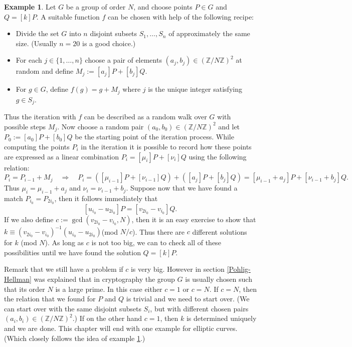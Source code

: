 \documentclass{article}
\numberwithin{equation}{section}
\theoremstyle{definition}
\newtheorem{example}[theorem]{Example}
\newcommand{\ZZ}{{\mathbb Z}} %
\newcommand{\Zmod}[1]{\ZZ / #1\ZZ} %
\begin{document}
\begin{example}\label{prhogenex}
Let $G$ be a group of order $N$, and choose points $P \in G$ and $Q=[k]P$. A suitable function $f$ can be chosen with help of the following recipe:
\begin{itemize}
\item Divide the set $G$ into $n$ disjoint subsets $S_1,\ldots,S_n$ of approximately the same size. (Usually $n=20$ is a good choice.) 
\item For each $j \in \{1,\ldots,n\}$ choose a pair of elements $(a_j,b_j)\in (\Zmod{N})^2$ at random and define $M_j:=[a_j]P+[b_j]Q$.
\item For $g\in G$, define $f(g) = g+M_j$ where $j$ is the unique integer satisfying $g \in S_j$.
\end{itemize}
Thus the iteration with $f$ can be described as a random walk over $G$ with possible steps $M_j$. Now choose a random pair $(a_0,b_0)\in (\Zmod{N})^2$ and let $P_0:=[a_0]P+[b_0]Q$ be the starting point of the iteration process. While computing the points $P_i$ in the iteration it is possible to record how these points are expressed as a linear combination $P_i=[\mu_i] P + [\nu_i] Q$ using the following relation: $$P_i=P_{i-1}+M_j \quad \Rightarrow \quad P_i = ([\mu_{i-1}]P+[\nu_{i-1}]Q)+([a_j]P+[b_j]Q) = [\mu_{i-1}+a_j]P+[\nu_{i-1}+b_j]Q.$$  Thus $\mu_i=\mu_{i-1}+a_j$ and $\nu_i=\nu_{i-1}+b_j$. Suppose now that we have found a match $P_{i_0}=P_{2i_0}$, then it follows immediately that $$[u_{i_0}-u_{2i_0}]P=[v_{2i_0}-v_{i_0}]Q.$$ If we also define $c:=\gcd(v_{2i_0}-v_{i_0},N)$, then it is an easy exercise to show that $k \equiv (v_{2i_0}-v_{i_0})^{-1}(u_{i_0}-u_{2i_0})$\newline (mod $N/c$). Thus there are $c$ different solutions for $k$ (mod $N$). As long as $c$ is not too big, we can to check all of these possibilities until we have found the solution $Q=[k]P$.  
\end{example}

Remark that we still have a problem if $c$ is very big. However in section \ref{Pohlig-Hellman} was explained that in cryptography the group $G$ is usually chosen such that its order $N$ is a large prime. In this case either $c=1$ or $c=N$. If $c=N$, then the relation that we found for $P$ and $Q$ is trivial and we need to start over. (We can start over with the same disjoint subsets $S_i$, but with different chosen pairs $(a_i,b_i) \in (\Zmod{N})^2$.) If on the other hand $c=1$, then $k$ is determined uniquely and we are done. This chapter will end with one example for elliptic curves. (Which closely follows the idea of example \ref{prhogenex}.)
\end{document}
